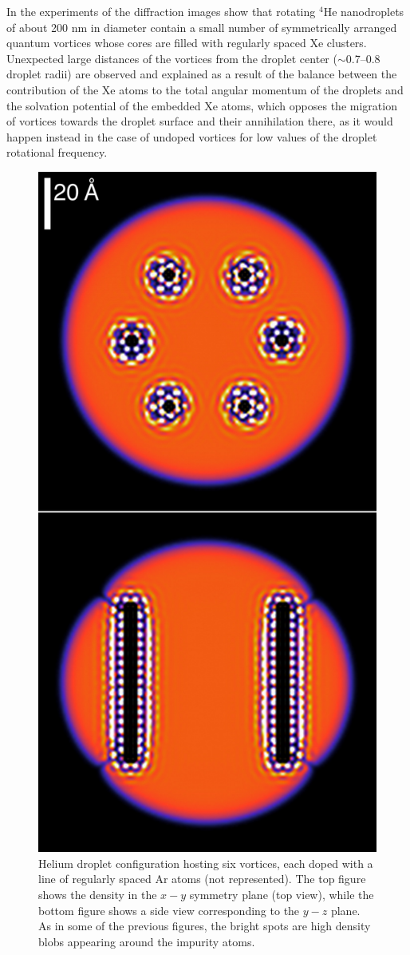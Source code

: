 In the experiments of the diffraction images 
show that rotating $^4$He nanodroplets of about 200 nm in diameter 
contain a small number of symmetrically arranged quantum 
vortices whose cores are filled with regularly spaced 
Xe clusters. Unexpected large distances 
of the vortices from the droplet center ($\sim$0.7--0.8 droplet radii) 
are observed and explained as a result of the balance between 
the contribution of the Xe atoms to the total angular momentum of the droplets and 
the solvation potential of the embedded Xe atoms, which opposes the migration of vortices
towards the droplet surface and their annihilation there, as it would
happen instead in the case of undoped vortices for low values of the
droplet rotational frequency.

\begin{figure}[!]
\centerline{\includegraphics[width=0.6\linewidth,clip]{fig13}}
\caption{\label{fig13-capture} 
Helium droplet configuration hosting six vortices, each doped with a line of 
regularly spaced Ar atoms (not represented). 
The top figure shows the density in the $x-y$
symmetry plane (top view), while the bottom figure shows a side view corresponding to the 
$y-z$ plane. 
As in some of the previous figures, the bright  spots are high density blobs appearing around the impurity atoms.
}
\end{figure}

